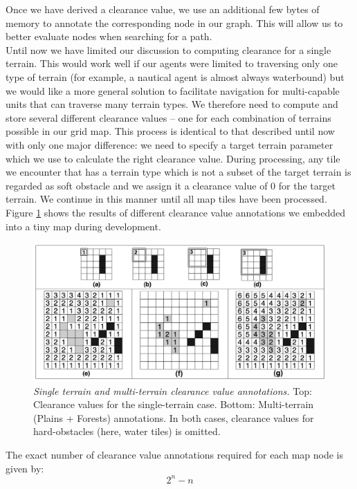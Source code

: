 Once we have derived a clearance value, we use an additional few bytes of memory to annotate the corresponding node in our graph. This will allow us to better evaluate nodes when searching for a path.\\ \newline
Until now we have limited our discussion to computing clearance for a single terrain. This would work well if our agents were limited to traversing only one type of terrain (for example, a nautical agent is almost always waterbound) but we would like a more general solution to facilitate navigation for multi-capable units that can traverse many terrain types. We therefore need to compute and store several different clearance values -- one for each combination of terrains possible in our grid map. This process is identical to that described until now with only one major difference: we need to specify a target terrain parameter which we use to calculate the right clearance value. During processing, any tile we encounter that has a terrain type which is not a subset of the target terrain is regarded as soft obstacle and we assign it a clearance value of 0 for the target terrain. We continue in this manner until all map tiles have been processed. Figure \ref{effp-fig:annotations} shows the results of different clearance value annotations we embedded into a tiny map during development.
\begin{figure}[htbp]
        \caption{\emph{Single terrain and multi-terrain clearance value annotations.} Top: Clearance values for the single-terrain case. Bottom: Multi-terrain (Plains + Forests) annotations. In both cases, clearance values for hard-obstacles (here, water tiles) is omitted.}
        \begin{center}
                        \includegraphics[scale=0.8]{diagrams/annotations.png}
        \end{center}
        \label{effp-fig:annotations}
\end{figure}
The exact number of clearance value annotations required for each map node is given by:
\begin{equation}
2^n - n
\label{effp-eq:cv}
\end{equation}

